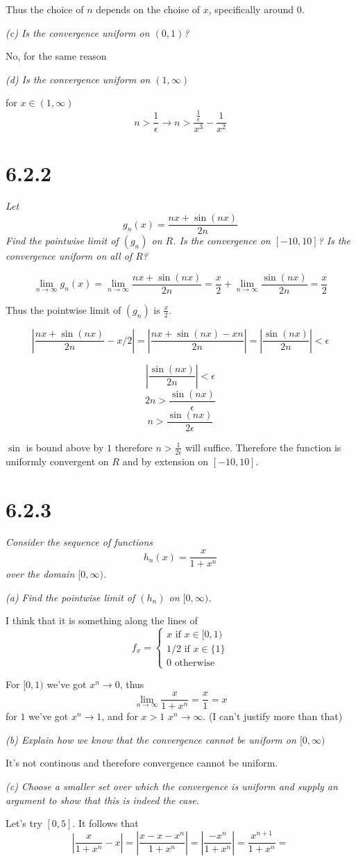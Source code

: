 \documentclass[11pt,oneside,titlepage]{book}
\begin{document}
Thus the choice of $n$ depends on the choise of $x$, specifically around
0.

\textit{(c) Is the convergence uniform on $(0, 1)$?}

No, for the same reason

\textit{(d) Is the convergence uniform on $(1, \infty)$}

for $x \in (1, \infty)$
$$n > \frac{1}{\epsilon} \to n > \frac{\frac{1}{\epsilon}}{x^3} - \frac{1}{x^2}$$


\section*{6.2.2}
\textit{Let}
$$g_n(x) = \frac{nx + \sin{(nx)}}{2n}$$
\textit{Find the pointwise limit of $(g_n)$ on $R$. Is the convergence on
  $[-10, 10]$? Is the convergence uniform on all of $R$?}

$$\lim_{n \to \infty}{g_n(x)} = \lim_{n \to \infty}\frac{nx + \sin{(nx)}}{2n}
= \frac{x}{2} + \lim_{n \to \infty}\frac{\sin{(nx)}}{2n} = \frac{x}{2}$$

Thus the pointwise limit of $(g_n)$ is $\frac{x}{2}$.

$$|\frac{nx + \sin{(nx)}}{2n} - x/2| =
|\frac{nx + \sin{(nx)} - xn}{2n} | =
|\frac{\sin{(nx)}}{2n} | < \epsilon$$

$$|\frac{\sin{(nx)}}{2n} | < \epsilon$$
$$2n  > \frac{\sin{(nx)}}{\epsilon}$$
$$n  > \frac{\sin{(nx)}}{2\epsilon}$$

$\sin$ is bound above by $1$ therefore $n > \frac{1}{2\epsilon}$ will suffice.
Therefore the function is uniformly convergent on $R$ and by
extension on $[-10, 10]$.

\section*{6.2.3}
\textit{Consider the sequence of functions}
$$h_n(x) = \frac{x}{1 + x^n}$$
\textit{over the domain $[0, \infty)$.}

\textit{(a) Find the pointwise limit of $(h_n)$ on $[0, \infty)$.}

I think that it is something along the lines of
$$
f_x =
\begin{cases}
  x \text{ if } x \in [0, 1) \\
  1/2 \text{ if } x \in \{1\} \\
  0 \text{ otherwise }
\end{cases}
$$

For $[0, 1)$ we've got $x^n \to 0$, thus
$$\lim_{n \to \infty}{\frac{x}{1 + x^n}} = \frac{x}{1} = x$$
for $1$ we've got $x^n \to 1$, and for $x > 1$ $x^n \to \infty$.
(I can't justify more than that)

\textit{(b) Explain how we know that the convergence cannot be uniform
  on $[0, \infty)$}

It's not continous and therefore convergence cannot be uniform.

\textit{(c) Choose a smaller set over which the convergence is uniform and
  supply an argument to show that this is indeed the case.}

Let's try $[0, 5]$. It follows that
$$\left|\frac{x}{1 + x^n} - x\right|  =
\left|\frac{x - x - x^n}{1 + x^n}\right|  =
\left|\frac{ - x^n}{1 + x^n}\right|  =
\frac{ x^{n + 1}}{1 + x^n}  =
$$
\end{document}
